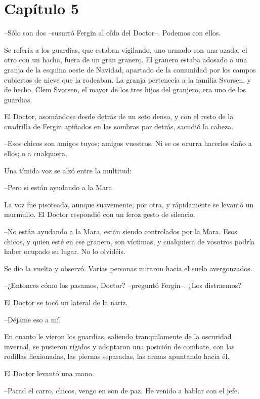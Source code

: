 \chapter*{Capítulo 5}

--Sólo son dos --susurró Fergin al oído del Doctor--. Podemos con ellos.

Se refería a los guardias, que estaban vigilando, uno armado con una azada, el otro con un hacha, fuera de un gran granero. El granero estaba adosado a una granja de la esquina oeste de Navidad, apartado de la comunidad por los campos cubiertos de nieve que la rodeaban. La granja pertenecía a la familia Svorsen, y de hecho, Clem Svorsen, el mayor de los tres hijos del granjero, era uno de los guardias.

El Doctor, asomándose desde detrás de un seto denso, y con el resto de la cuadrilla de Fergin apiñados en las sombras por detrás, sacudió la cabeza.

--Esos chicos son amigos tuyos; amigos vuestros. Ni se os ocurra hacerles daño a ellos; o a cualquiera.

Una tímida voz se alzó entre la multitud:

--Pero si están ayudando a la Mara.

La voz fue pisoteada, aunque suavemente, por otra, y rápidamente se levantó un murmullo. El Doctor respondió con un feroz gesto de silencio.

--No están ayudando a la Mara, están siendo controlados por la Mara. Esos chicos, y quien esté en ese granero, son víctimas, y cualquiera de vosotros podría haber ocupado su lugar. No lo olvidéis.

Se dio la vuelta y observó. Varias personas miraron hacia el suelo avergonzados.

--¿Entonces cómo los pasamos, Doctor? --preguntó Fergin--. ¿Los distraemos?

El Doctor se tocó un lateral de la nariz.

--Déjame eso a mí.



En cuanto le vieron los guardias, saliendo tranquilamente de la oscuridad invernal, se pusieron rígidos y adoptaron una posición de combate, con las rodillas flexionadas, las piernas separadas, las armas apuntando hacia él.

El Doctor levantó una mano.

--Parad el carro, chicos, vengo en son de paz. He venido a hablar con el jefe.

